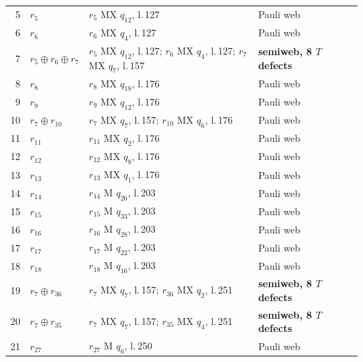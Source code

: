 \documentclass[11pt]{article}
\begin{document}
\begin{semiwebaddition}
{\begin{longtable}{rp{.3\linewidth}p{.43\linewidth}lr}
5 & $r_{5}$ & $r_{5}$ MX $q_{12}$, l.\,127 & Pauli web & \hyperref[d5_det005]{\pageref*{d5_det005}}\\
6 & $r_{6}$ & $r_{6}$ MX $q_{4}$, l.\,127 & Pauli web & \hyperref[d5_det006]{\pageref*{d5_det006}}\\
7 & $r_{5}\oplus r_{6}\oplus r_{7}$ & $r_{5}$ MX $q_{12}$, l.\,127; $r_{6}$ MX $q_{4}$, l.\,127; $r_{7}$ MX $q_{7}$, l.\,157 & \textbf{semiweb, 8 $T$ defects} & \hyperref[d5_det007]{\pageref*{d5_det007}}\\
8 & $r_{8}$ & $r_{8}$ MX $q_{18}$, l.\,176 & Pauli web & \hyperref[d5_det008]{\pageref*{d5_det008}}\\
9 & $r_{9}$ & $r_{9}$ MX $q_{12}$, l.\,176 & Pauli web & \hyperref[d5_det009]{\pageref*{d5_det009}}\\
10 & $r_{7}\oplus r_{10}$ & $r_{7}$ MX $q_{7}$, l.\,157; $r_{10}$ MX $q_{6}$, l.\,176 & Pauli web & \hyperref[d5_det010]{\pageref*{d5_det010}}\\
11 & $r_{11}$ & $r_{11}$ MX $q_{2}$, l.\,176 & Pauli web & \hyperref[d5_det011]{\pageref*{d5_det011}}\\
12 & $r_{12}$ & $r_{12}$ MX $q_{8}$, l.\,176 & Pauli web & \hyperref[d5_det012]{\pageref*{d5_det012}}\\
13 & $r_{13}$ & $r_{13}$ MX $q_{1}$, l.\,176 & Pauli web & \hyperref[d5_det013]{\pageref*{d5_det013}}\\
14 & $r_{14}$ & $r_{14}$ M $q_{26}$, l.\,203 & Pauli web & \hyperref[d5_det014]{\pageref*{d5_det014}}\\
15 & $r_{15}$ & $r_{15}$ M $q_{33}$, l.\,203 & Pauli web & \hyperref[d5_det015]{\pageref*{d5_det015}}\\
16 & $r_{16}$ & $r_{16}$ M $q_{28}$, l.\,203 & Pauli web & \hyperref[d5_det016]{\pageref*{d5_det016}}\\
17 & $r_{17}$ & $r_{17}$ M $q_{22}$, l.\,203 & Pauli web & \hyperref[d5_det017]{\pageref*{d5_det017}}\\
18 & $r_{18}$ & $r_{18}$ M $q_{16}$, l.\,203 & Pauli web & \hyperref[d5_det018]{\pageref*{d5_det018}}\\
19 & $r_{7}\oplus r_{36}$ & $r_{7}$ MX $q_{7}$, l.\,157; $r_{36}$ MX $q_{2}$, l.\,251 & \textbf{semiweb, 8 $T$ defects} & \hyperref[d5_det019]{\pageref*{d5_det019}}\\
20 & $r_{7}\oplus r_{35}$ & $r_{7}$ MX $q_{7}$, l.\,157; $r_{35}$ MX $q_{4}$, l.\,251 & \textbf{semiweb, 8 $T$ defects} & \hyperref[d5_det020]{\pageref*{d5_det020}}\\
21 & $r_{27}$ & $r_{27}$ M $q_{6}$, l.\,250 & Pauli web & \hyperref[d5_det021]{\pageref*{d5_det021}}\\

\end{longtable}}
\end{semiwebaddition}
\end{document}
